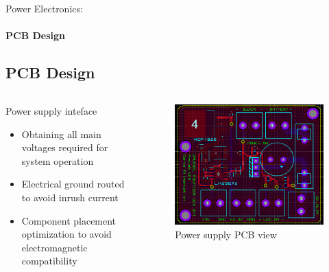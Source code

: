 \documentclass{beamer}
\begin{document}
	\begin{frame}{Power Electronics:}
		\framesubtitle{PCB Design}
		\subsection[PCB Design]{PCB Design}
		\begin{columns}[T]
	  		\begin{column}{0.5\textwidth}
	  			Power supply inteface
		    	\begin{itemize}
		    		\item Obtaining all main voltages required for system operation
		    		\item Electrical ground routed to avoid inrush current
		    		\item Component placement optimization to avoid electromagnetic compatibility
		    	\end{itemize}
	  		\end{column}
	  		\begin{column}{0.5\textwidth}
	  			\begin{figure}
	  				\begin{center}
	  					\includegraphics[height=0.5\textheight]{../Illus/PCB_Alim.PNG}
	  				\end{center}
	    			\caption{Power supply PCB view}
	    		\end{figure}
	  		\end{column}
		\end{columns}
	\end{frame}
\end{document}
